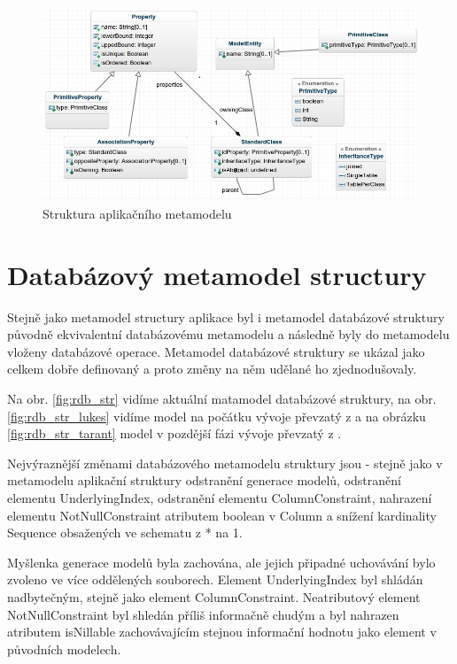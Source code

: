 \documentclass[11pt,twoside,a4paper]{book}
\begin{document}
\begin{figure}[ht]
\begin{center}
\includegraphics[width=15cm]{figures/app_meta}
\caption{Struktura aplikačního metamodelu}
\label{fig:app_meta}
\end{center}
\end{figure}

\section{Databázový metamodel structury}

Stejně jako metamodel structury aplikace byl i metamodel databázové struktury
původně ekvivalentní databázovému metamodelu a následně byly do metamodelu
vloženy databázové operace. Metamodel databázové struktury se ukázal jako
celkem dobře definovaný a proto změny na něm udělané ho zjednodušovaly.

Na obr. \ref{fig:rdb_str} vidíme aktuální matamodel databázové struktury, na
obr. \ref{fig:rdb_str_lukes} vidíme model na počátku vývoje převzatý z
\cite{Lukes} a na obrázku \ref{fig:rdb_str_tarant} model v pozdější fázi vývoje
převzatý z \cite{Tarant_bp}.

 Nejvýraznější změnami databázového metamodelu struktury jsou - stejně jako v
 metamodelu aplikační struktury odstranění generace modelů, odstranění elementu
 UnderlyingIndex, odstranění elementu ColumnConstraint, nahrazení elementu
 NotNullConstraint atributem boolean v Column a snížení kardinality Sequence
 obsažených ve schematu z * na 1.
 
 Myšlenka generace modelů byla zachována, ale jejich připadné uchovávání bylo
 zvoleno ve více oddělených souborech. Element UnderlyingIndex byl shládán
 nadbytečným, stejně jako element ColumnConstraint. Neatributový element
 NotNullConstraint byl shledán příliš informačně chudým a byl nahrazen atributem
 isNillable zachovávajícím stejnou informační hodnotu jako element v původních
 modelech. 
	
\end{document}
